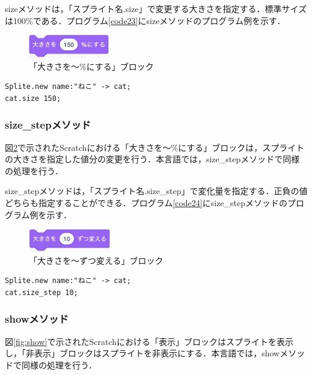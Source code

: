 \documentclass[10pt,a4j]{ltjsarticle}
\begin{document}
sizeメソッドは，「スプライト名.size」で変更する大きさを指定する．標準サイズは100\%である．プログラム\ref{code23}にsizeメソッドのプログラム例を示す．

\begin{figure}[H]
  \centering
  \includegraphics[height=10mm]{images/size.pdf}
  \caption{「大きさを〜\%にする」ブロック}
  \label{fig:size}
\end{figure}

\begin{lstlisting}[caption=sizeメソッドのプログラム例, label=code23]
Splite.new name:"ねこ" -> cat;
cat.size 150;
\end{lstlisting}

\subsubsection{size\_stepメソッド}
図\ref{fig:size_step}で示されたScratchにおける「大きさを〜\%にする」ブロックは，スプライトの大きさを指定した値分の変更を行う．本言語では，size\_stepメソッドで同様の処理を行う．

size\_stepメソッドは，「スプライト名.size\_step」で変化量を指定する．正負の値どちらも指定することができる．プログラム\ref{code24}にsize\_stepメソッドのプログラム例を示す．

\begin{figure}[H]
  \centering
  \includegraphics[height=10mm]{images/size_step.pdf}
  \caption{「大きさを〜ずつ変える」ブロック}
  \label{fig:size_step}
\end{figure}

\begin{lstlisting}[caption=size\_stepメソッドのプログラム例, label=code24]
Splite.new name:"ねこ" -> cat;
cat.size_step 10;
\end{lstlisting}

\subsubsection{showメソッド}
図\ref{fig:show}で示されたScratchにおける「表示」ブロックはスプライトを表示し，「非表示」ブロックはスプライトを非表示にする．本言語では，showメソッドで同様の処理を行う．
\end{document}
